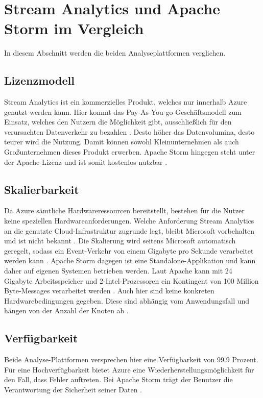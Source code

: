 \section{Stream Analytics und Apache Storm im Vergleich}
In diesem Abschnitt werden die beiden Analyseplattformen verglichen. 


\subsection{Lizenzmodell}
Stream Analytics ist ein kommerzielles Produkt, welches nur innerhalb Azure genutzt werden kann. Hier kommt das Pay-As-You-go-Geschäftsmodell zum Einsatz, welches den Nutzern die Möglichkeit gibt, ausschließlich für den verursachten Datenverkehr zu bezahlen \cite{Pricing.2017}. Desto höher das Datenvolumina, desto teurer wird die Nutzung. Damit können sowohl Kleinunternehmen als auch Großunternehmen dieses Produkt erwerben. Apache Storm hingegen steht unter der Apache-Lizenz und ist somit kostenlos nutzbar \cite{lizenz.2004}. 

\subsection{Skalierbarkeit}
Da Azure sämtliche Hardwareressourcen bereitstellt, bestehen für die Nutzer keine speziellen Hardwareanforderungen. Welche Anforderung Stream Analytics an die genutzte Cloud-Infrastruktur zugrunde legt, bleibt Microsoft vorbehalten und ist nicht bekannt \cite{samacha.2017}. Die Skalierung wird seitens Microsoft automatisch geregelt, sodass ein Event-Verkehr von einem Gigabyte pro Sekunde verarbeitet werden kann \cite{samacha.19.12.2017b}. Apache Storm dagegen ist eine Standalone-Applikation und kann daher auf eigenen Systemen betrieben werden. Laut Apache kann mit 24 Gigabyte Arbeitsspeicher und 2-Intel-Prozessoren ein Kontingent von 100 Million Byte-Messages verarbeitet werden \cite{apachescale.2017}. Auch hier sind keine konkreten Hardwarebedingungen gegeben. Diese sind abhängig vom Anwendungsfall und hängen von der Anzahl der Knoten ab \cite{samacha.2017}.

\subsection{Verfügbarkeit}
Beide Analyse-Plattformen versprechen hier eine Verfügbarkeit von 99.9 Prozent. Für eine Hochverfügbarkeit bietet Azure eine Wiederherstellungsmöglichkeit für den Fall, dass Fehler auftreten. Bei Apache Storm  trägt der Benutzer die Verantwortung der Sicherheit seiner Daten \cite{samacha.2017} \cite{apachescale.2017}. 

